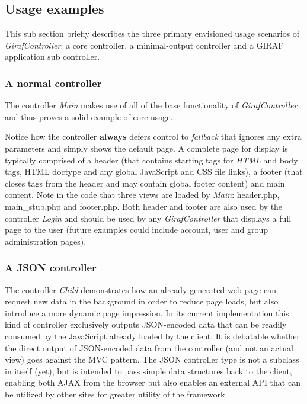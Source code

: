 \subsection{Usage examples}
This sub section briefly describes the three primary envisioned usage scenarios of \emph{GirafController}: a core controller, a minimal-output controller and a GIRAF application sub controller.

\subsubsection*{A normal controller}
The controller \emph{Main} makes use of all of the base functionality of \emph{GirafController} and thus proves a solid example of core usage.



Notice how the controller \textbf{always} defers control to \emph{fallback} that ignores any extra parameters and simply shows the default page. A complete page for display is typically comprised of a header (that contains starting tags for \emph{HTML} and body tags, HTML doctype and any global JavaScript and CSS file links), a footer (that closes tags from the header and may contain global footer content) and main content. Note in the code that three views are loaded by \emph{Main}: header.php, main\_stub.php and footer.php. Both header and footer are also used by the controller \emph{Login} and should be used by any \emph{GirafController} that displays a full page to the user (future examples could include account, user and group administration pages).

\subsubsection*{A JSON controller}


The controller \emph{Child} demonstrates how an already generated web page can request new data in the background in order to reduce page loads, but also introduce a more dynamic page impression. In its current implementation this kind of controller exclusively outputs JSON-encoded data that can be readily consumed by the JavaScript already loaded by the client. It is debatable whether the direct output of JSON-encoded data from the controller (and not an actual view) goes against the MVC pattern.
The JSON controller type is not a subclass in itself (yet), but is intended to pass simple data structures back to the client, enabling both AJAX from the browser but also enables an external API that can be utilized by other sites for greater utility of the framework
\newline
